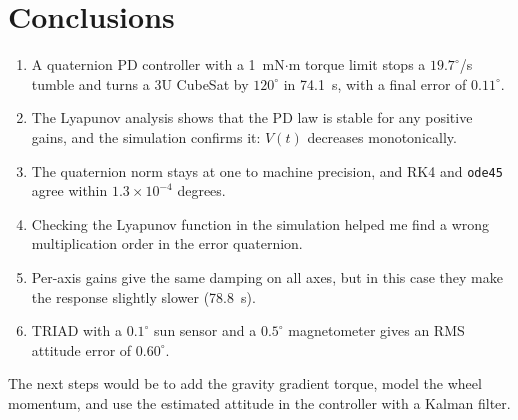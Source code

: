 \documentclass[letterpaper,10pt]{article}
\begin{document}
\section{Conclusions}

\begin{enumerate}[leftmargin=2.2em,itemsep=0pt]
  \item A quaternion PD controller with a 1~mN$\cdot$m torque limit stops a
        $19.7^\circ$/s tumble and turns a 3U CubeSat by $120^\circ$ in
        74.1~s, with a final error of $0.11^\circ$.
  \item The Lyapunov analysis shows that the PD law is stable for any
        positive gains, and the simulation confirms it: $V(t)$ decreases
        monotonically.
  \item The quaternion norm stays at one to machine precision, and RK4 and
        \texttt{ode45} agree within $1.3\times10^{-4}$ degrees.
  \item Checking the Lyapunov function in the simulation helped me find a
        wrong multiplication order in the error quaternion.
  \item Per-axis gains give the same damping on all axes, but in this case
        they make the response slightly slower (78.8~s).
  \item TRIAD with a $0.1^\circ$ sun sensor and a $0.5^\circ$ magnetometer gives
        an RMS attitude error of $0.60^\circ$.
\end{enumerate}

The next steps would be to add the gravity gradient torque, model the wheel
momentum, and use the estimated attitude in the controller with a Kalman
filter.
\end{document}
